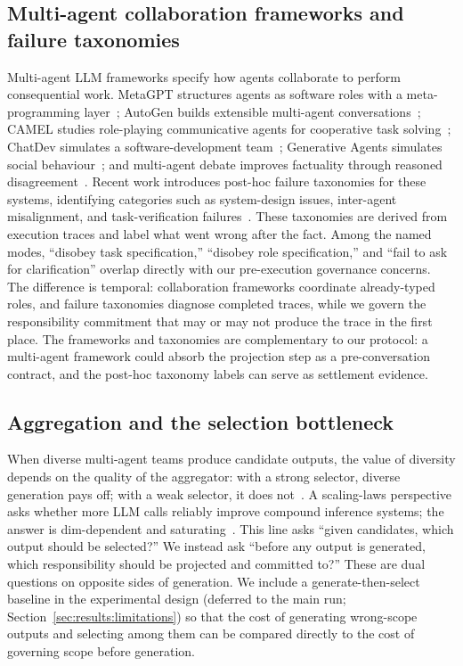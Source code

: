\subsection{Multi-agent collaboration frameworks and failure taxonomies}
\label{sec:related:mast}

Multi-agent LLM frameworks specify how agents collaborate to perform consequential work. MetaGPT structures agents as software roles with a meta-programming layer~\cite{hong2024metagpt}; AutoGen builds extensible multi-agent conversations~\cite{wu2024autogen}; CAMEL studies role-playing communicative agents for cooperative task solving~\cite{li2023camel}; ChatDev simulates a software-development team~\cite{qian2024chatdev}; Generative Agents simulates social behaviour~\cite{park2023generative}; and multi-agent debate improves factuality through reasoned disagreement~\cite{du2024debate}. Recent work introduces post-hoc failure taxonomies for these systems, identifying categories such as system-design issues, inter-agent misalignment, and task-verification failures~\cite{mast2025}. These taxonomies are derived from execution traces and label what went wrong after the fact. Among the named modes, ``disobey task specification,'' ``disobey role specification,'' and ``fail to ask for clarification'' overlap directly with our pre-execution governance concerns. The difference is temporal: collaboration frameworks coordinate already-typed roles, and failure taxonomies diagnose completed traces, while we govern the responsibility commitment that may or may not produce the trace in the first place. The frameworks and taxonomies are complementary to our protocol: a multi-agent framework could absorb the projection step as a pre-conversation contract, and the post-hoc taxonomy labels can serve as settlement evidence.

\subsection{Aggregation and the selection bottleneck}
\label{sec:related:selection}

When diverse multi-agent teams produce candidate outputs, the value of diversity depends on the quality of the aggregator: with a strong selector, diverse generation pays off; with a weak selector, it does not~\cite{whenagree2024}. A scaling-laws perspective asks whether more LLM calls reliably improve compound inference systems; the answer is dim-dependent and saturating~\cite{chen2024scaling}. This line asks ``given candidates, which output should be selected?'' We instead ask ``before any output is generated, which responsibility should be projected and committed to?'' These are dual questions on opposite sides of generation. We include a generate-then-select baseline in the experimental design (deferred to the main run; Section~\ref{sec:results:limitations}) so that the cost of generating wrong-scope outputs and selecting among them can be compared directly to the cost of governing scope before generation.

